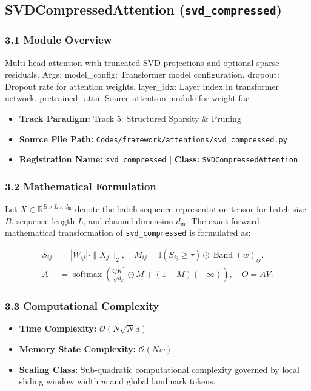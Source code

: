 \subsection{SVDCompressedAttention (\texttt{svd\_compressed})}
\label{sec:app_module_svd\_compressed}

\subsubsection*{3.1 Module Overview}
Multi-head attention with truncated SVD projections and optional sparse residuals.  Args:     model\_config: Transformer model configuration.     dropout: Dropout rate for attention weights.     layer\_idx: Layer index in transformer network.     pretrained\_attn: Source attention module for weight fac
\begin{itemize}
    \item \textbf{Track Paradigm:} Track 5: Structured Sparsity & Pruning
    \item \textbf{Source File Path:} \texttt{Codes/framework/attentions/svd\_compressed.py}
    \item \textbf{Registration Name:} \texttt{svd\_compressed} $\mid$ \textbf{Class:} \texttt{SVDCompressedAttention}
\end{itemize}

\subsubsection*{3.2 Mathematical Formulation}
Let $X \in \mathbb{R}^{B \times L \times d_{\text{in}}}$ denote the batch sequence representation tensor for batch size $B$, sequence length $L$, and channel dimension $d_{\text{in}}$. The exact forward mathematical transformation of \texttt{svd\_compressed} is formulated as:

\begin{align}
S_{ij} &= |W_{ij}| \cdot \|X_j\|_2, \quad M_{ij} = \mathbb{I}(S_{ij} \ge \tau) \odot \operatorname{Band}(w)_{ij}, \\
A &= \operatorname{softmax}\left(\frac{Q K^\top}{\sqrt{d_k}} \odot M + (1 - M)(-\infty)\right), \quad O = A V.
\end{align}


\subsubsection*{3.3 Computational Complexity}
\begin{itemize}
    \item \textbf{Time Complexity:} $\mathcal{O}(N \sqrt{N} d)$
    \item \textbf{Memory State Complexity:} $\mathcal{O}(N w)$
    \item \textbf{Scaling Class:} Sub-quadratic computational complexity governed by local sliding window width $w$ and global landmark tokens.
\end{itemize}

